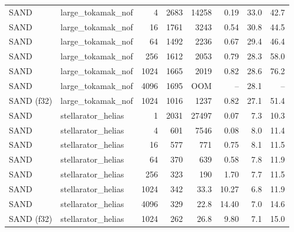 \begin{tabular}{llrrrrrr}
SAND & large\_tokamak\_nof & 4 & 2683 & 14258 & 0.19 & 33.0 & 42.7 \\
SAND & large\_tokamak\_nof & 16 & 1761 & 3243 & 0.54 & 30.8 & 44.5 \\
SAND & large\_tokamak\_nof & 64 & 1492 & 2236 & 0.67 & 29.4 & 46.4 \\
SAND & large\_tokamak\_nof & 256 & 1612 & 2053 & 0.79 & 28.3 & 58.0 \\
SAND & large\_tokamak\_nof & 1024 & 1665 & 2019 & 0.82 & 28.6 & 76.2 \\
SAND & large\_tokamak\_nof & 4096 & 1695 & OOM & -- & 28.1 & -- \\
SAND (f32) & large\_tokamak\_nof & 1024 & 1016 & 1237 & 0.82 & 27.1 & 51.4 \\
SAND & stellarator\_helias & 1 & 2031 & 27497 & 0.07 & 7.3 & 10.3 \\
SAND & stellarator\_helias & 4 & 601 & 7546 & 0.08 & 8.0 & 11.4 \\
SAND & stellarator\_helias & 16 & 577 & 771 & 0.75 & 8.1 & 11.5 \\
SAND & stellarator\_helias & 64 & 370 & 639 & 0.58 & 7.8 & 11.9 \\
SAND & stellarator\_helias & 256 & 323 & 190 & 1.70 & 7.7 & 11.5 \\
SAND & stellarator\_helias & 1024 & 342 & 33.3 & 10.27 & 6.8 & 11.9 \\
SAND & stellarator\_helias & 4096 & 329 & 22.8 & 14.40 & 7.0 & 14.6 \\
SAND (f32) & stellarator\_helias & 1024 & 262 & 26.8 & 9.80 & 7.1 & 15.0 \\
\bottomrule
\end{tabular}
